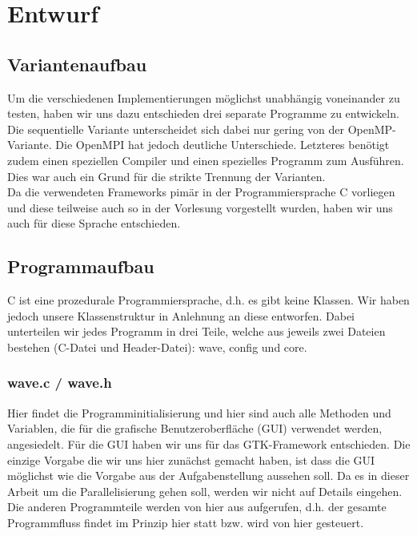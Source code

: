 
\section{Entwurf}
\subsection{Variantenaufbau}
Um die verschiedenen Implementierungen möglichst unabhängig voneinander zu testen, haben wir uns dazu entschieden drei separate Programme zu entwickeln. Die sequentielle Variante unterscheidet sich dabei nur gering von der OpenMP-Variante. Die OpenMPI hat jedoch deutliche Unterschiede. Letzteres benötigt zudem einen speziellen Compiler und einen spezielles Programm zum Ausführen. Dies war auch ein Grund für die strikte Trennung der Varianten.\\
Da die verwendeten Frameworks pimär in der Programmiersprache C vorliegen und diese teilweise auch so in der Vorlesung vorgestellt wurden, haben wir uns auch für diese Sprache entschieden.

\subsection{Programmaufbau}
C ist eine prozedurale Programmiersprache, d.h. es gibt keine Klassen. Wir haben jedoch unsere Klassenstruktur in Anlehnung an diese entworfen. Dabei unterteilen wir jedes Programm in drei Teile, welche aus jeweils zwei Dateien bestehen (C-Datei und Header-Datei): wave, config und core.

\subsubsection{wave.c / wave.h}
Hier findet die Programminitialisierung und hier sind auch alle Methoden und Variablen, die für die grafische Benutzeroberfläche (GUI) verwendet werden, angesiedelt. Für die GUI haben wir uns für das GTK-Framework entschieden. Die einzige Vorgabe die wir uns hier zunächst gemacht haben, ist dass die GUI möglichst wie die Vorgabe aus der Aufgabenstellung aussehen soll. Da es in dieser Arbeit um die Parallelisierung gehen soll, werden wir nicht auf Details eingehen.\\
Die anderen Programmteile werden von hier aus aufgerufen, d.h. der gesamte Programmfluss findet im Prinzip hier statt bzw. wird von hier gesteuert.

